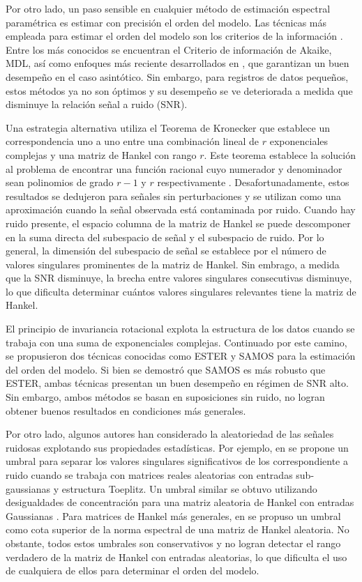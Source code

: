 Por otro lado, un paso sensible en cualquier método de estimación espectral paramétrica es estimar con precisión el orden del modelo.  Las técnicas más empleada para estimar el orden del modelo son los criterios de la información \cite{Stoica2004}. Entre los más conocidos se encuentran el Criterio de información de Akaike, MDL, así como enfoques más reciente desarrollados en \cite{Mariani2015, Nielsen2013}, que garantizan un buen desempeño en el caso asintótico. Sin embargo, para registros de datos pequeños, estos métodos ya no son óptimos y su desempeño se ve deteriorada a medida que disminuye la relación señal a ruido (SNR).

Una estrategia alternativa utiliza el Teorema de Kronecker \cite{Gantmacher1960} que establece un correspondencia uno a uno entre una combinación lineal de $r$ exponenciales complejas y una matriz de Hankel con rango $r$. Este teorema establece la solución al problema de encontrar una función racional cuyo numerador y denominador sean polinomios de grado $r-1$ y $r$ respectivamente  \cite{Fuhrmann2011}. Desafortunadamente, estos resultados se  dedujeron para señales sin perturbaciones y se utilizan como una aproximación cuando la señal observada está contaminada por ruido. Cuando hay ruido presente, el espacio columna de la matriz de Hankel se puede descomponer en la suma directa del subespacio de señal y el subespacio de ruido. Por lo general, la dimensión del subespacio de señal se establece por el número de valores singulares prominentes de la matriz de Hankel. Sin embrago, a medida que la SNR disminuye, la brecha entre valores singulares consecutivas disminuye, lo que dificulta determinar cuántos valores singulares relevantes tiene la matriz de Hankel.

El principio de invariancia rotacional \cite{Roy1989} explota la estructura de los datos cuando se trabaja con una suma de exponenciales complejas. Continuado por este camino, se propusieron dos técnicas conocidas como ESTER y SAMOS \cite{Badeau2006, Papy2007} para la estimación del orden del modelo. Si bien se demostró que SAMOS es más robusto que ESTER, ambas técnicas presentan un buen desempeño en régimen de SNR alto. Sin embargo, ambos métodos se basan en suposiciones sin ruido, no logran obtener buenos resultados en condiciones más generales. 

Por otro lado, algunos autores han considerado la aleatoriedad de las señales ruidosas explotando sus propiedades estadísticas. Por ejemplo, en \cite{Qiao2020} se propone un umbral para separar los valores singulares significativos de los correspondiente a ruido cuando se trabaja con matrices reales aleatorias con entradas sub-gaussianas y estructura Toeplitz. Un umbral similar se obtuvo utilizando desigualdades de concentración para una matriz aleatoria de Hankel con entradas Gaussianas \cite{tropp2015}. Para matrices de Hankel más generales, en \cite{Hokanson2020} se propuso un umbral como cota superior de la norma espectral de una matriz de Hankel aleatoria. No obstante, todos estos umbrales son conservativos y no logran detectar el rango verdadero de la matriz de Hankel con entradas aleatorias, lo que dificulta el uso de cualquiera de ellos para determinar el orden del modelo. 

